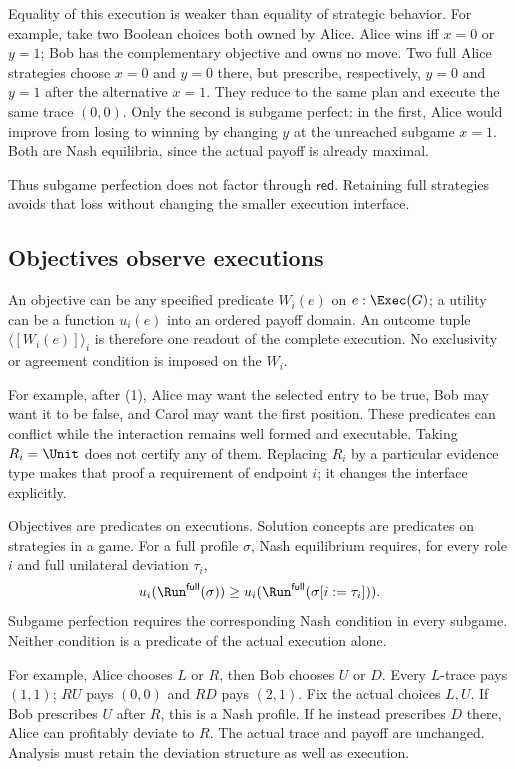 Equality of this execution is weaker than equality of strategic behavior.
For example, take two Boolean choices both owned by Alice. Alice wins iff
$x=0$ or $y=1$; Bob has the complementary objective and owns no move.
Two full Alice strategies choose $x=0$ and $y=0$ there, but prescribe,
respectively, $y=0$ and $y=1$ after the alternative $x=1$.
They reduce to the same plan and execute the same trace $(0,0)$.
Only the second is subgame perfect: in the first, Alice would improve
from losing to winning by changing $y$ at the unreached subgame $x=1$.
Both are Nash equilibria, since the actual payoff is already maximal.

Thus subgame perfection does not factor through $\mathsf{red}$.
Retaining full strategies avoids that loss without changing the smaller
execution interface.

\subsection{Objectives observe executions}

An objective can be any specified predicate $W_i(e)$ on $e:\Exec(G)$; a utility
can be a function $u_i(e)$ into an ordered payoff domain. An outcome tuple
$\langle[W_i(e)]\rangle_i$ is therefore one readout of the complete execution.
No exclusivity or agreement condition is imposed on the $W_i$.

For example, after (1), Alice may want the selected entry to be true, Bob may
want it to be false, and Carol may want the first position. These predicates
can conflict while the interaction remains well formed and executable.
Taking $R_i=\Unit$ does not certify any of them. Replacing $R_i$ by a
particular evidence type makes that proof a requirement of endpoint $i$;
it changes the interface explicitly.

Objectives are predicates on executions. Solution concepts are predicates
on strategies in a game. For a full profile $\sigma$, Nash equilibrium
requires, for every role $i$ and full unilateral deviation $\tau_i$,
\[
 u_i(\Run^{\mathsf{full}}(\sigma))\ge
 u_i(\Run^{\mathsf{full}}(\sigma[i:=\tau_i])).
\]
Subgame perfection requires the corresponding Nash condition in every
subgame. Neither condition is a predicate of the actual execution alone.

For example, Alice chooses $L$ or $R$, then Bob chooses $U$ or $D$.
Every $L$-trace pays $(1,1)$; $RU$ pays $(0,0)$ and $RD$ pays $(2,1)$.
Fix the actual choices $L,U$. If Bob prescribes $U$ after $R$, this is a
Nash profile. If he instead prescribes $D$ there, Alice can profitably
deviate to $R$. The actual trace and payoff are unchanged. Analysis must
retain the deviation structure as well as execution.

